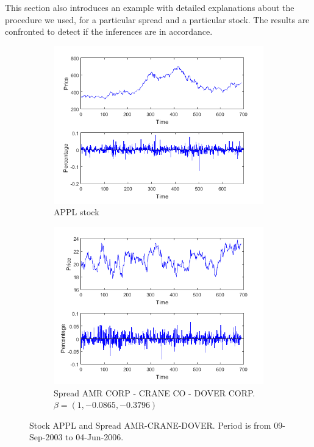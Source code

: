 \documentclass[11pt,a4,twosided,singlespacing,titlepagenumber=on]{scrreprt}
\numberwithin{equation}{chapter} %
\theoremstyle{remark}
\begin{document}
This section also introduces an example with detailed explanations about the procedure we used, for a particular spread and a particular stock. The results are confronted to detect if the inferences are in accordance.
\label{sec:model_selection}
\begin{figure}[H]
    \centering
    \begin{subfigure}[t]{0.49\textwidth}
        \centering
        \includegraphics[width=1\textwidth]{apple_2003_2006}
        \caption{APPL stock}
        \label{apple_2003_2006}
    \end{subfigure}
    \begin{subfigure}[t]{0.49\textwidth}
        \centering
        \includegraphics[width=1\textwidth]{spread_amr_crane_2003_2006}
        \caption{Spread AMR CORP - CRANE CO - DOVER CORP. $\beta = (1, -0.0865, -0.3796)$}
        \label{spread_amr_crane_2003_2006}
    \end{subfigure}
    \caption{Stock APPL and Spread AMR-CRANE-DOVER. Period is from 09-Sep-2003 to 04-Jun-2006.}
\end{figure}
\end{document}
